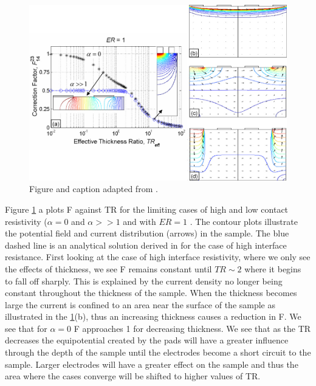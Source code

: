 
\begin{figure}[t]
  \centering
    \includegraphics[width=\textwidth]{fig/4pp/ER1.png}
 \caption{  Figure and caption adapted from \cite{Zimney2007CorrectionStudy}.}
 \label{ER1}
\end{figure}


Figure \ref{ER1} a plots F against TR for the limiting cases of high and low contact resistivity ($\alpha = 0$ and $\alpha >> 1$ and with $ER = 1$ . The contour plots illustrate the potential field and current distribution (arrows) in the sample. The blue dashed line is an analytical solution derived in \cite{} for the case of high interface resistance. First looking at the case of high interface resistivity, where we only see the effects of thickness, we see F remains constant until $TR \sim 2$ where it begins to fall off sharply. This is explained by the current density no longer being constant throughout the thickness of the sample. When the thickness becomes large the current is confined to an area near the surface of the sample as illustrated in the \ref{ER1}(b), thus an increasing thickness causes a reduction in F. 
We see that for $\alpha = 0$ F approaches 1 for decreasing thickness. We see that as the TR decreases the equipotential created by the pads will have a greater influence through the depth of the sample until the electrodes become a short circuit to the sample. Larger electrodes will have a greater effect on the sample and thus the area where the cases converge will be shifted to higher values of TR. 

